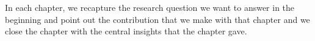 In each chapter, we recapture the research question we want to answer in the beginning and point out the contribution that we make with that chapter and we close the chapter with the central insights that the chapter gave.








